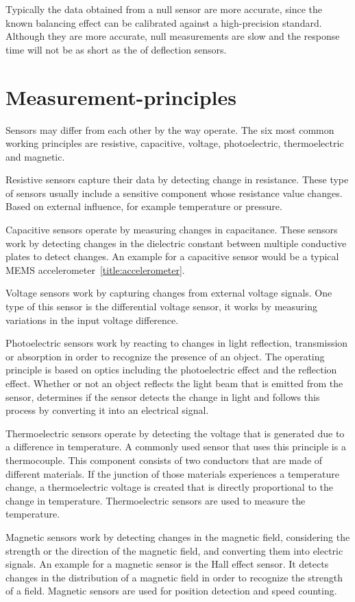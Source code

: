 Typically the data obtained from a null sensor are more accurate, since the known balancing effect can be calibrated against a high-precision standard. Although they are more accurate, null measurements are slow and the response time will not be as short as the of deflection sensors.

\noindent\cite{LRBook:01}


\section{Measurement-principles}
Sensors may differ from each other by the way operate. The six most common working principles are resistive, capacitive, voltage, photoelectric, thermoelectric and magnetic.

Resistive sensors capture their data by detecting change in resistance. These type of sensors usually include a sensitive component whose resistance value changes. Based on external influence, for example temperature or pressure.

Capacitive sensors operate by measuring changes in capacitance. These sensors work by detecting changes in the dielectric constant between multiple conductive plates to detect changes. An example for a capacitive sensor would be a typical MEMS accelerometer~\ref{title:accelerometer}.

Voltage sensors work by capturing changes from external voltage signals. One type of this sensor is the differential voltage sensor, it works by measuring variations in the input voltage difference.

Photoelectric sensors work by reacting to changes in light reflection, transmission or absorption in order to recognize the presence of an object. The operating principle is based on optics including the photoelectric effect and the reflection effect. Whether or not an object reflects the light beam that is emitted from the sensor, determines if the sensor detects the change in light and follows this process by converting it into an electrical signal.

Thermoelectric sensors operate by detecting the voltage that is generated due to a difference in temperature. A commonly used sensor that uses this principle is a thermocouple. This component consists of two conductors that are made of different materials. If the junction of those materials experiences a temperature change, a thermoelectric voltage is created that is directly proportional to the change in temperature. Thermoelectric sensors are used to measure the temperature.

Magnetic sensors work by detecting changes in the magnetic field, considering the strength or the direction of the magnetic field, and converting them into electric signals. An example for a magnetic sensor is the Hall effect sensor. It detects changes in the distribution of a magnetic field in order to recognize the strength of a field. Magnetic sensors are used for position detection and speed counting.

\noindent\cite{LRWeb:58}